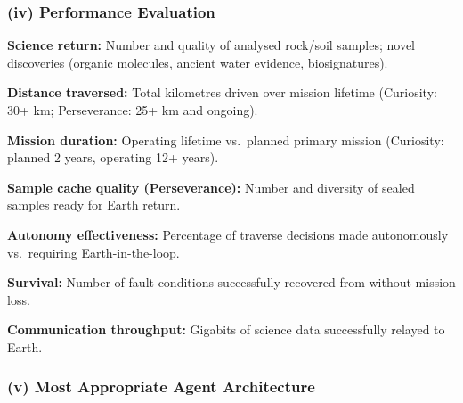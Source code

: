 \documentclass[12pt, a4paper]{article}
\begin{document}
\subsubsection*{(iv) Performance Evaluation}

\begin{keypoints}
  \item \textbf{Science return:} Number and quality of analysed rock/soil samples; novel discoveries (organic molecules, ancient water evidence, biosignatures).
  \item \textbf{Distance traversed:} Total kilometres driven over mission lifetime (Curiosity: 30+ km; Perseverance: 25+ km and ongoing).
  \item \textbf{Mission duration:} Operating lifetime vs.\ planned primary mission (Curiosity: planned 2 years, operating 12+ years).
  \item \textbf{Sample cache quality (Perseverance):} Number and diversity of sealed samples ready for Earth return.
  \item \textbf{Autonomy effectiveness:} Percentage of traverse decisions made autonomously vs.\ requiring Earth-in-the-loop.
  \item \textbf{Survival:} Number of fault conditions successfully recovered from without mission loss.
  \item \textbf{Communication throughput:} Gigabits of science data successfully relayed to Earth.
\end{keypoints}

\subsubsection*{(v) Most Appropriate Agent Architecture}
\end{document}
